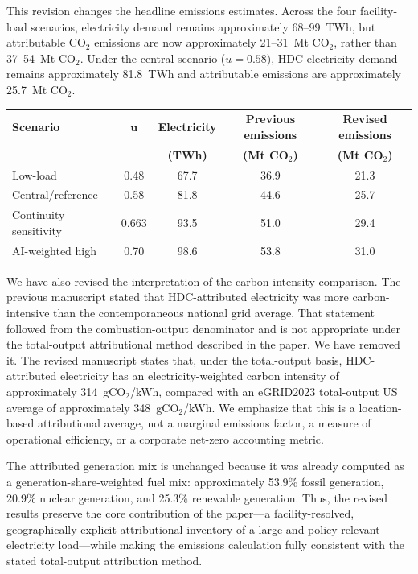 \documentclass[11pt]{article}
\begin{document}
This revision changes the headline emissions estimates. Across the four facility-load scenarios, electricity demand remains approximately 68--99~TWh, but attributable CO$_2$ emissions are now approximately 21--31~Mt CO$_2$, rather than 37--54~Mt CO$_2$. Under the central scenario ($u=0.58$), HDC electricity demand remains approximately 81.8~TWh and attributable emissions are approximately 25.7~Mt CO$_2$.

\begin{center}
\begin{tabular}{lcccc}
\toprule
\textbf{Scenario} & $\boldsymbol{u}$ & \textbf{Electricity} & \textbf{Previous emissions} & \textbf{Revised emissions} \\
 & & \textbf{(TWh)} & \textbf{(Mt CO$_2$)} & \textbf{(Mt CO$_2$)} \\
\midrule
Low-load & 0.48 & 67.7 & 36.9 & 21.3 \\
Central/reference & 0.58 & 81.8 & 44.6 & 25.7 \\
Continuity sensitivity & 0.663 & 93.5 & 51.0 & 29.4 \\
AI-weighted high & 0.70 & 98.6 & 53.8 & 31.0 \\
\bottomrule
\end{tabular}
\end{center}

We have also revised the interpretation of the carbon-intensity comparison. The previous manuscript stated that HDC-attributed electricity was more carbon-intensive than the contemporaneous national grid average. That statement followed from the combustion-output denominator and is not appropriate under the total-output attributional method described in the paper. We have removed it. The revised manuscript states that, under the total-output basis, HDC-attributed electricity has an electricity-weighted carbon intensity of approximately 314~gCO$_2$/kWh, compared with an eGRID2023 total-output US average of approximately 348~gCO$_2$/kWh. We emphasize that this is a location-based attributional average, not a marginal emissions factor, a measure of operational efficiency, or a corporate net-zero accounting metric.

The attributed generation mix is unchanged because it was already computed as a generation-share-weighted fuel mix: approximately 53.9\% fossil generation, 20.9\% nuclear generation, and 25.3\% renewable generation. Thus, the revised results preserve the core contribution of the paper---a facility-resolved, geographically explicit attributional inventory of a large and policy-relevant electricity load---while making the emissions calculation fully consistent with the stated total-output attribution method.
\end{document}
